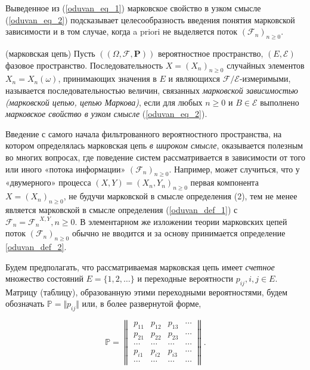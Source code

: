 Выведенное из (\ref{oduvan_eq_1}) марковское свойство в узком смысле (\ref{oduvan_eq_2}) подсказывает целесообразность введения понятия марковской зависимости и в том
случае, когда a priori не выделяется поток ${(\mathscr{F}_n)}_{n \geq 0}$.

\begin{definition}\label{oduvan_def_2}(марковская цепь) Пусть $((\Omega, \mathscr{F}, \mathbf{P}))$ вероятностное пространство, $(E, \mathscr{E})$ фазовое пространство. Последовательность $X = {(X_n)}_{n \geq 0}$ случайных элементов $X_n = X_n(\omega)$, принимающих значения
в $E$ и являющихся $\mathscr{F}/\mathscr{E}$-измеримыми, называется последовательностью величин, связанных \emph{марковской зависимостью (марковской цепью, цепью Маркова)}, если для любых $n \geq 0$ и $B \in \mathscr{E}$ выполнено \emph{марковское свойство в узком смысле} (\ref{oduvan_eq_2}).
\end{definition}

\begin{remark} Введение с самого начала фильтрованного вероятностного пространства, на котором определялась марковская цепь \emph{в широком смысле}, оказывается полезным во многих вопросах, где поведение
систем рассматривается в зависимости от того или иного «потока информации» ${(\mathscr{F}_n)}_{n \geq 0}$. Например, может случиться, что у «двумерного» процесса $(X, Y) = (X_n, Y_n)_{n \geq 0}$ первая компонента $X = {(X_n)}_{n \geq 0}$, не будучи марковской в смысле определения (2), тем не менее является марковской в смысле определения (\ref{oduvan_def_1}) с ${\mathscr{F}_n} = {\mathscr{F}_n}^{X, Y}, n \geq 0$. В элементарном же изложении теории марковских цепей поток ${(\mathscr{F}_n)}_{n \geq 0}$ обычно не вводится и за
основу принимается определение \ref{oduvan_def_2}.
\end{remark}

Будем предполагать, что рассматриваемая марковская цепь имеет
\emph{счетное} множество состояний $E = \{1, 2, \ldots\}$ и переходные вероятности $p_{ij}, i,j \in E$. Матрицу (таблицу), образованную этими переходными вероятностями, будем обозначать $\mathbb {P} = \Vert p_{ij} \Vert$ или, в более развернутой форме,

\[ \mathbb {P} = \begin{Vmatrix}
  p_{11}& p_{12}& p_{13}& \cdots\\
  p_{21}& p_{22}& p_{23}& \cdots\\
  \cdots & \cdots & \cdots& \cdots\\
  p_{i1}& p_{i2}& p_{i3}& \cdots\\
  \cdots & \cdots & \cdots& \cdots
\end{Vmatrix}. \]

